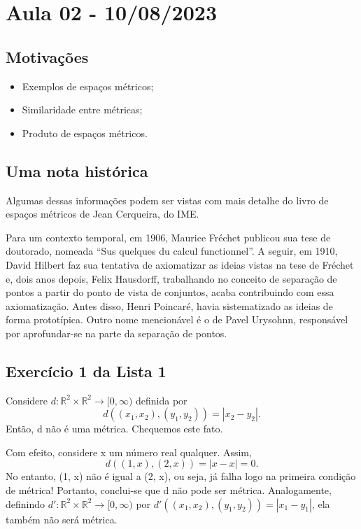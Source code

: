 \documentclass[MetricSpaces/metric_notes.tex]{subfiles}
\begin{document}
\section{Aula 02 - 10/08/2023}
\subsection{Motivações}
\begin{itemize}
	\item Exemplos de espaços métricos;
	\item Similaridade entre métricas;
	\item Produto de espaços métricos.
\end{itemize}
\subsection{Uma nota histórica}
Algumas dessas informações podem ser vistas com mais detalhe do livro de espaços métricos
de Jean Cerqueira, do IME.

Para um contexto temporal, em 1906, Maurice Fréchet publicou sua tese de doutorado, nomeada
``Sus quelques du calcul functionnel''. A seguir, em 1910, David Hilbert faz sua tentativa de axiomatizar
as ideias vistas na tese de Fréchet e, dois anos depois, Felix Hausdorff, trabalhando no conceito de separação de pontos
a partir do ponto de vista de conjuntos, acaba contribuindo com essa axiomatização. Antes disso, Henri Poincaré, havia sistematizado as ideias
de forma prototípica. Outro nome mencionável é o de Pavel Urysohnn, responsável por aprofundar-se na parte da separação de pontos.

\subsection{Exercício 1 da Lista 1}
Considere \(d:\mathbb{R}^{2}\times \mathbb{R}^{2}\rightarrow [0, \infty) \) definida por
\[
	d((x_{1}, x_{2}), (y_{1}, y_{2})) = |x_{2}-y_{2}|.
\]
Então, d não é uma métrica. Chequemos este fato.

Com efeito, considere x um número real qualquer. Assim,
\[
	d((1, x), (2, x)) = |x-x| = 0.
\]
No entanto, (1, x) não é igual a (2, x), ou seja, já falha logo na primeira condição de métrica!
Portanto, conclui-se que d não pode ser métrica. Analogamente, definindo \(d':\mathbb{R}^{2}\times \mathbb{R}^{2}\rightarrow [0, \infty)\) por
\(d'((x_{1}, x_{2}), (y_{1}, y_{2}))=|x_{1}-y_{1}|\), ela também não será métrica.
\end{document}
